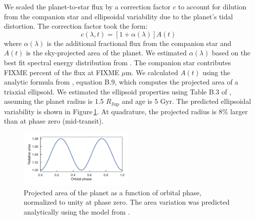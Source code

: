 \documentclass[twocolumn]{aastex61}
\begin{document}
We scaled the planet-to-star flux by a correction factor $c$ to account for dilution from the companion star and ellipsoidal variability due to the planet's tidal distortion. The correction factor took the form: 
\begin{equation}
	c(\lambda, t) = [1 + \alpha(\lambda)]A(t)
\end{equation}
where $\alpha(\lambda)$ is the additional fractional flux from the companion star and $A(t)$ is the sky-projected area of the planet. We estimated $\alpha(\lambda)$ based on the best fit spectral energy distribution from \cite{cartier17}. The companion star contributes FIXME percent of the flux at FIXME $\mu$m.  We calculated $A(t)$ using the analytic formula from \cite{leconte11b}, equation B.9, which computes the projected area of a triaxial ellipsoid. We estimated the ellipsoid properties using Table B.3 of \cite{leconte11a}, assuming the planet radius is 1.5 $R_\mathrm{Jup}$ and age is 5 Gyr. The predicted ellipsoidal variability is shown in Figure\,\ref{fig:ellipsoidal}. At quadrature, the projected radius is $8\%$ larger than at phase zero (mid-transit). %




\begin{figure}
\includegraphics[width = 0.5\textwidth]{Figures/ellipsoidal.pdf}
\caption{Projected area of the planet as a function of orbital phase, normalized to unity at phase zero. The area variation was predicted analytically using the model from \cite{leconte11b}.}
\label{fig:ellipsoidal}
\end{figure}
\end{document}
